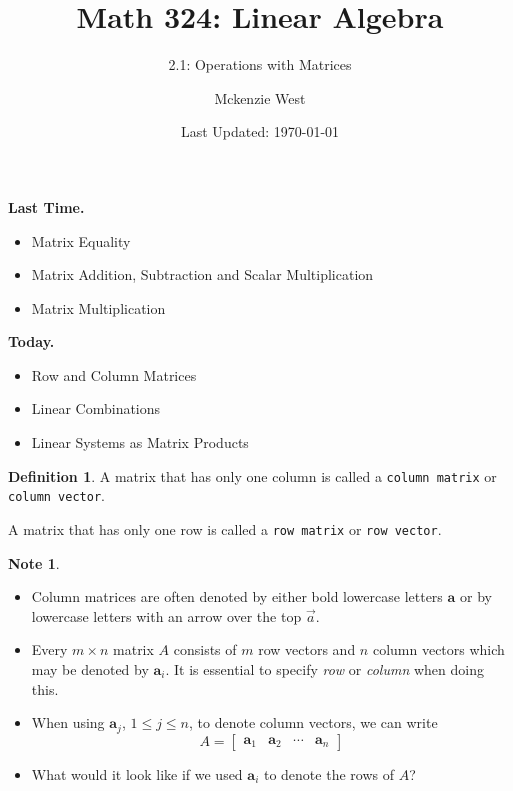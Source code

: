 \documentclass[handout]{beamer}
\newcommand{\fn}{\insertframenumber}
\theoremstyle{definition}
\newtheorem*{defn}{Definition}
\newtheorem*{nb}{Note}
\renewcommand{\emph}[1]{{\color{blue}\texttt{#1}}}
\begin{document}
	\title{Math 324: Linear Algebra}
	\subtitle{2.1: Operations with Matrices}
	\author{Mckenzie West}
	\date{Last Updated: \today}
\begin{frame}
\maketitle
\end{frame}

\begin{frame}{\insertframenumber}
	\begin{block}{\textbf{Last Time.}}
	\begin{itemize}[label=--]
		\item Matrix Equality
		\item Matrix Addition, Subtraction and Scalar Multiplication
		\item Matrix Multiplication
	\end{itemize}
	\end{block}
\begin{block}{\textbf{Today.}}
	\begin{itemize}[label=--]
		\item Row and Column Matrices
		\item Linear Combinations
		\item Linear Systems as Matrix Products
	\end{itemize}
\end{block}
\end{frame}

\begin{frame}{\fn}
	\begin{defn}
		A matrix that has only one column is called a \emph{column matrix} or \emph{column vector}.
		
		A matrix that has only one row is called a \emph{row matrix} or \emph{row vector}.
	\end{defn}
	\begin{nb}
		\begin{itemize}[label = --]
			\item Column matrices are often denoted by either bold lowercase letters $\mathbf{a}$ or by lowercase letters with an arrow over the top $\vec{a}$.
			\item Every $m\times n$ matrix $A$ consists of $m$ row vectors and $n$ column vectors which may be denoted by $\mathbf{a}_i$.  It is essential to specify \textit{row} or \textit{column} when doing this. 
			\item When using $\mathbf{a}_j$, $1\leq j\leq n$, to denote column vectors, we can write
			\[A=\begin{bmatrix}
			\mathbf{a}_1&\mathbf{a}_2&\cdots & \mathbf{a}_n
			\end{bmatrix}\]
			\item What would it look like if we used $\mathbf{a}_i$ to denote the rows of $A$?
		\end{itemize}
	\end{nb}
\end{frame}
\end{document}
